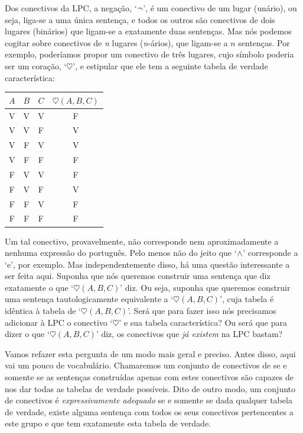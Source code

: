 Dos conectivos da LPC, a negação, `$\neg$', é um conectivo de um lugar (unário), ou seja, liga-se a uma única sentença, e todos os outros são conectivos de dois lugares (binários) que ligam-se a exatamente duas sentenças.
Mas nós podemos cogitar sobre conectivos de \textit{n} lugares (\textit{n}-ários), que ligam-se a $n$ sentenças.
Por exemplo, poderíamos propor um conectivo de três lugares, cujo símbolo poderia ser um coração, `$\heartsuit$', e estipular que ele tem a seguinte tabela de verdade característica:
\begin{center}
\begin{tabular}{c c c | c}
$A$ & $B$ & $C$ & $\heartsuit(A,B,C)$\\
\hline
 V & V & V & F \\
 V & V & F & V \\
 V & F & V & V \\
 V & F & F & F \\
 F & V & V & F \\
 F & V & F & V \\
 F & F & V & F \\
 F & F & F & F
\end{tabular}
\end{center}
Um tal conectivo, provavelmente, não corresponde nem aproximadamente a nenhuma expressão do português. Pelo menos não do jeito que `$\wedge$' corresponde a `e', por exemplo.
Mas independentemente disso, há uma questão interessante a ser feita aqui. Suponha que nós queremos construir uma sentença que diz exatamente o que `$\heartsuit(A,B,C)$' diz.
Ou seja, suponha que queremos construir uma sentença tautologicamente equivalente a `$\heartsuit(A,B,C)$', cuja tabela é idêntica à tabela de `$\heartsuit(A,B,C)$'.
Será que para fazer isso nós precisamos adicionar à LPC o conectivo  `$\heartsuit$' e sua tabela característica?
Ou será que para dizer o que `$\heartsuit(A,B,C)$' diz, os conectivos que \emph{já existem} na LPC bastam?

Vamos refazer esta pergunta de um modo mais geral e preciso.
Antes disso, aqui vai um pouco de vocabulário.
Chamaremos um conjunto de conectivos de  se e somente se as sentenças construídas apenas com estes conectivos são capazes de nos dar todas as tabelas de verdade possíveis.
Dito de outro modo, um conjunto de conectivos é \emph{expressivamente adequado} se e somente se dada qualquer tabela de verdade, existe alguma sentença com todos os seus conectivos pertencentes a este grupo e que tem exatamente esta tabela de verdade.

